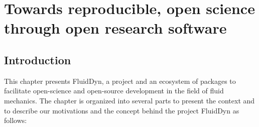 \chapter{Towards reproducible, open science through open research software}
\section{Introduction}



%


This chapter presents FluidDyn, a project and an ecosystem of packages to
facilitate open-science and open-source development in the field of fluid
mechanics.
%
The chapter is organized into several parts to present the context and to
describe our motivations and the concept behind the project FluidDyn as
follows:

